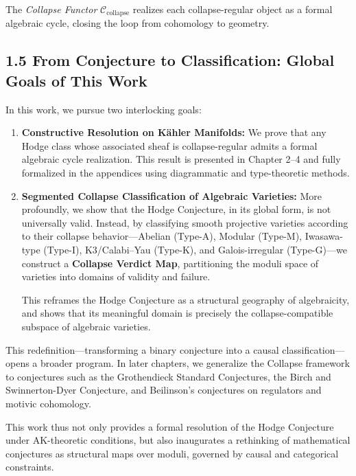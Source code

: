 \documentclass[11pt]{article}
\begin{document}
The \emph{Collapse Functor} $\mathcal{C}_{\text{collapse}}$ realizes each collapse-regular object as a formal algebraic cycle, closing the loop from cohomology to geometry.

\subsection{1.5 From Conjecture to Classification: Global Goals of This Work}

In this work, we pursue two interlocking goals:

\begin{enumerate}
  \item \textbf{Constructive Resolution on Kähler Manifolds:} We prove that any Hodge class whose associated sheaf is collapse-regular admits a formal algebraic cycle realization. This result is presented in Chapter 2–4 and fully formalized in the appendices using diagrammatic and type-theoretic methods.

  \item \textbf{Segmented Collapse Classification of Algebraic Varieties:} More profoundly, we show that the Hodge Conjecture, in its global form, is not universally valid. Instead, by classifying smooth projective varieties according to their collapse behavior—Abelian (Type-A), Modular (Type-M), Iwasawa-type (Type-I), K3/Calabi–Yau (Type-K), and Galois-irregular (Type-G)—we construct a \textbf{Collapse Verdict Map}, partitioning the moduli space of varieties into domains of validity and failure.

  This reframes the Hodge Conjecture as a structural geography of algebraicity, and shows that its meaningful domain is precisely the collapse-compatible subspace of algebraic varieties.
\end{enumerate}

This redefinition—transforming a binary conjecture into a causal classification—opens a broader program. In later chapters, we generalize the Collapse framework to conjectures such as the Grothendieck Standard Conjectures, the Birch and Swinnerton-Dyer Conjecture, and Beilinson's conjectures on regulators and motivic cohomology.

\bigskip

This work thus not only provides a formal resolution of the Hodge Conjecture under AK-theoretic conditions, but also inaugurates a rethinking of mathematical conjectures as structural maps over moduli, governed by causal and categorical constraints.
\end{document}
